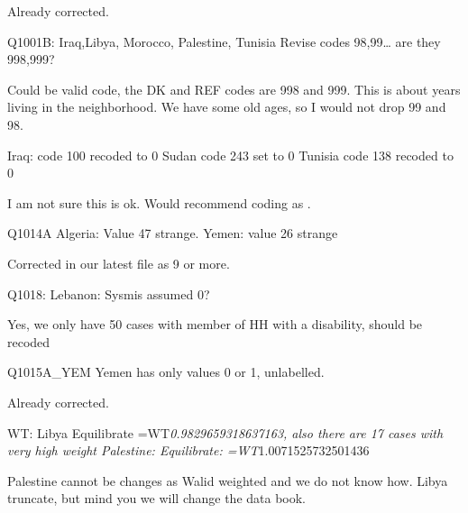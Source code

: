 \documentclass[]{article}
\begin{document}
Already corrected.

Q1001B: Iraq,Libya, Morocco, Palestine, Tunisia Revise codes
98,99\ldots{} are they 998,999?

Could be valid code, the DK and REF codes are 998 and 999. This is about
years living in the neighborhood. We have some old ages, so I would not
drop 99 and 98.

Iraq: code 100 recoded to 0 Sudan code 243 set to 0 Tunisia code 138
recoded to 0

I am not sure this is ok. Would recommend coding as .

Q1014A Algeria: Value 47 strange. Yemen: value 26 strange

Corrected in our latest file as 9 or more.

Q1018: Lebanon: Sysmis assumed 0?

Yes, we only have 50 cases with member of HH with a disability, should
be recoded

Q1015A\_YEM Yemen has only values 0 or 1, unlabelled.

Already corrected.

WT: Libya Equilibrate =WT\emph{0.9829659318637163, also there are 17
cases with very high weight Palestine: Equilibrate:
=WT}1.0071525732501436

Palestine cannot be changes as Walid weighted and we do not know how.
Libya truncate, but mind you we will change the data book.
\end{document}
